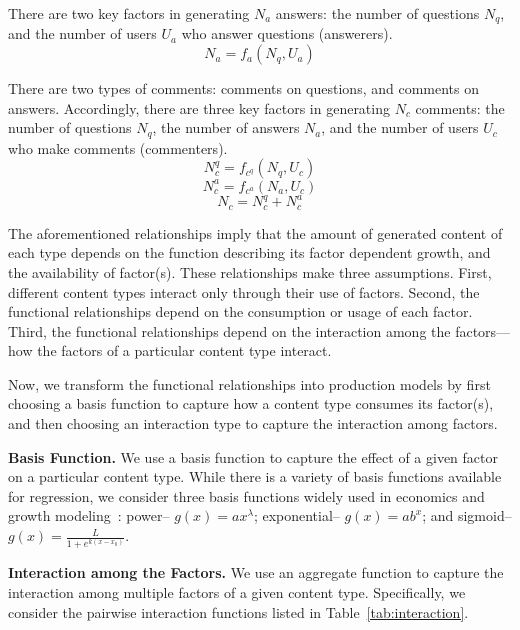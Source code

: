 There are two key factors in generating $N_a$ answers: the number of questions $N_q$, and the number of users $U_a$ who answer questions (answerers). 
\begin{equation*}
N_a = f_a(N_q, U_a)
\end{equation*}

There are two types of comments: comments on questions, and comments on answers. Accordingly, there are three key factors in generating $N_c$ comments: the number of questions $N_q$, the number of answers $N_a$, and the number of users $U_c$ who make comments (commenters). 
\begin{equation*}
N_c^q = f_{c^q}(N_q, U_c)
\end{equation*}
\begin{equation*}
N_c^a = f_{c^a}(N_a, U_c)
\end{equation*}
\begin{equation*}
N_c = N_c^q + N_c^a
\end{equation*}

The aforementioned relationships imply that the amount of generated content of each type depends on the function describing its factor dependent growth, and the availability of factor(s). These relationships make three assumptions. First, different content types interact only through their use of factors. Second, the functional relationships depend on the consumption or usage of each factor. Third, the functional relationships depend on the interaction among the factors---how the factors of a particular content type interact. 

Now, we transform the functional relationships into production models by first choosing a basis function to capture how a content type consumes its factor(s), and then choosing an interaction type to capture the interaction among factors.

\textbf{Basis Function.} We use a basis function to capture the effect of a given factor on a particular content type. While there is a variety of basis functions available for regression, we consider three basis functions widely used in economics and growth modeling~\cite{fekedulegn1999}: power-- $g(x) = ax^{\lambda}$; exponential-- $g(x) = ab^x$; and sigmoid-- $g(x) = \frac{L}{1+e^{k(x-x_0)}}$. 

\textbf{Interaction among the Factors.} We use an aggregate function to capture the interaction among multiple factors of a given content type. Specifically, we consider the pairwise interaction functions listed in Table~\ref{tab:interaction}. 


